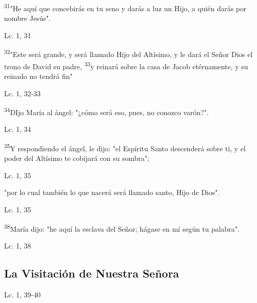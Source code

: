 \documentclass[a4paper,11pt,sans]{article}
\begin{document}
      \textsuperscript{31}"He aquí que concebirás en tu seno y darás a luz un Hijo, a quién darás por nombre Jesús".

      \begin{center}
        Lc. 1, 31      
      \end{center}

      \textsuperscript{32}"Este será grande, y será llamado Hijo del Altísimo, y le dará el Señor Dios el trono de David su padre, \textsuperscript{33}y reinará
      sobre la casa de Jacob etérnamente, y su reinado no tendrá fin"

      \begin{center}
        Lc. 1, 32-33        
      \end{center}
      
      \textsuperscript{34}DIjo María al ángel: "¿cómo será eso, pues, no conozco varón?".

      \begin{center}
        Lc. 1, 34         
      \end{center}
      
      \textsuperscript{35}Y respondiendo el ángel, le dijo: "el Espíritu Santo descenderá sobre ti, y el poder del Altísimo te cobijará con su sombra";

      \begin{center}
        Lc. 1, 35       
      \end{center}
      
      "por lo cual también lo que nacerá será llamado santo, Hijo de Dios".

      \begin{center}
        Lc. 1, 35      
      \end{center}      
      
      \textsuperscript{38}María dijo: "he aquí la esclava del Señor; hágase en mí según tu palabra".

      \begin{center}
        Lc. 1, 38      
      \end{center}
            
    \subsection*{\hfil La Visitación de Nuestra Señora \hfil}
      
      \begin{multicols}{2}

      \columnbreak
          
      \end{multicols}
      \begin{center}
        Lc. 1, 39-40        
      \end{center}
      
\end{document}
